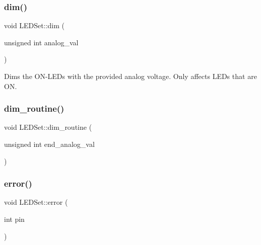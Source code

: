\subsubsection{\texorpdfstring{dim()}{dim()}}
{\footnotesize\ttfamily void L\+E\+D\+Set\+::dim (\begin{DoxyParamCaption}\item[{unsigned int}]{analog\+\_\+val }\end{DoxyParamCaption})\hspace{0.3cm}{\ttfamily [inline]}}



Dims the O\+N-\/\+L\+E\+Ds with the provided analog voltage. Only affects L\+E\+Ds that are ON. 

\mbox{\label{classLEDSet_a7b8c21a6888b762a42ee3292ddc6bba9}} 
\subsubsection{\texorpdfstring{dim\+\_\+routine()}{dim\_routine()}}
{\footnotesize\ttfamily void L\+E\+D\+Set\+::dim\+\_\+routine (\begin{DoxyParamCaption}\item[{unsigned int}]{end\+\_\+analog\+\_\+val }\end{DoxyParamCaption})\hspace{0.3cm}{\ttfamily [inline]}}

\mbox{\label{classLEDSet_aee9276cba956882a006f7cdd6124e487}} 
\subsubsection{\texorpdfstring{error()}{error()}}
{\footnotesize\ttfamily void L\+E\+D\+Set\+::error (\begin{DoxyParamCaption}\item[{int}]{pin }\end{DoxyParamCaption})\hspace{0.3cm}{\ttfamily [inline]}}

\mbox{\label{classLEDSet_a2ab948b2ac81a4b4e0ace4b51579ad86}} 
